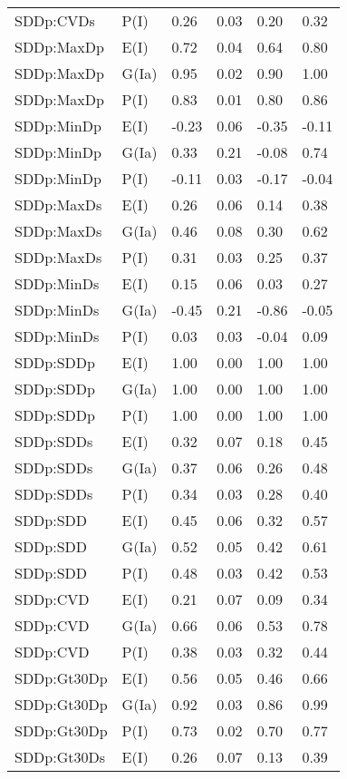\begin{center}
\begin{longtable}{|p{1.1in}|p{0.7in}|p{0.7in}|p{0.6in}|p{0.6in}|p{0.6in}|}
  SDDp:CVDs & P(I) & 0.26 & 0.03 & 0.20 & 0.32 \\ 
  SDDp:MaxDp & E(I) & 0.72 & 0.04 & 0.64 & 0.80 \\ 
  SDDp:MaxDp & G(Ia) & 0.95 & 0.02 & 0.90 & 1.00 \\ 
  SDDp:MaxDp & P(I) & 0.83 & 0.01 & 0.80 & 0.86 \\ 
  SDDp:MinDp & E(I) & -0.23 & 0.06 & -0.35 & -0.11 \\ 
  SDDp:MinDp & G(Ia) & 0.33 & 0.21 & -0.08 & 0.74 \\ 
  SDDp:MinDp & P(I) & -0.11 & 0.03 & -0.17 & -0.04 \\ 
  SDDp:MaxDs & E(I) & 0.26 & 0.06 & 0.14 & 0.38 \\ 
  SDDp:MaxDs & G(Ia) & 0.46 & 0.08 & 0.30 & 0.62 \\ 
  SDDp:MaxDs & P(I) & 0.31 & 0.03 & 0.25 & 0.37 \\ 
  SDDp:MinDs & E(I) & 0.15 & 0.06 & 0.03 & 0.27 \\ 
  SDDp:MinDs & G(Ia) & -0.45 & 0.21 & -0.86 & -0.05 \\ 
  SDDp:MinDs & P(I) & 0.03 & 0.03 & -0.04 & 0.09 \\ 
  SDDp:SDDp & E(I) & 1.00 & 0.00 & 1.00 & 1.00 \\ 
  SDDp:SDDp & G(Ia) & 1.00 & 0.00 & 1.00 & 1.00 \\ 
  SDDp:SDDp & P(I) & 1.00 & 0.00 & 1.00 & 1.00 \\ 
  SDDp:SDDs & E(I) & 0.32 & 0.07 & 0.18 & 0.45 \\ 
  SDDp:SDDs & G(Ia) & 0.37 & 0.06 & 0.26 & 0.48 \\ 
  SDDp:SDDs & P(I) & 0.34 & 0.03 & 0.28 & 0.40 \\ 
  SDDp:SDD & E(I) & 0.45 & 0.06 & 0.32 & 0.57 \\ 
  SDDp:SDD & G(Ia) & 0.52 & 0.05 & 0.42 & 0.61 \\ 
  SDDp:SDD & P(I) & 0.48 & 0.03 & 0.42 & 0.53 \\ 
  SDDp:CVD & E(I) & 0.21 & 0.07 & 0.09 & 0.34 \\ 
  SDDp:CVD & G(Ia) & 0.66 & 0.06 & 0.53 & 0.78 \\ 
  SDDp:CVD & P(I) & 0.38 & 0.03 & 0.32 & 0.44 \\ 
  SDDp:Gt30Dp & E(I) & 0.56 & 0.05 & 0.46 & 0.66 \\ 
  SDDp:Gt30Dp & G(Ia) & 0.92 & 0.03 & 0.86 & 0.99 \\ 
  SDDp:Gt30Dp & P(I) & 0.73 & 0.02 & 0.70 & 0.77 \\ 
  SDDp:Gt30Ds & E(I) & 0.26 & 0.07 & 0.13 & 0.39 \\ 

\end{longtable}
\end{center}
